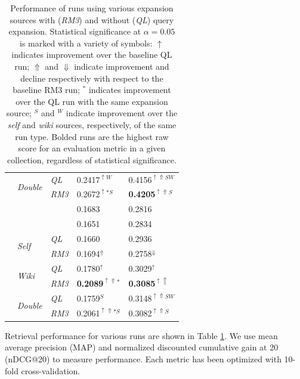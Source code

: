 \documentclass{sig-alternate}
\begin{document}
\begin{table}[htbp]
\begin{tabular}{|c|l|l|l|l|}
\rule{0pt}{2.5ex} & \multirow{2}{*}{\it Double} & {\it QL} & 0.2417$^{\uparrow W}$ & 0.4156$^{\uparrow\Uparrow SW}$ \\ \cline{3-5}
\rule{0pt}{2.5ex} & & {\it RM3} & 0.2672$^{\uparrow *S}$ & \textbf{0.4205}$^{\uparrow\Uparrow S}$ \\ \hline\hline
\rule{0pt}{2.5ex} \multirow{8}{*}{wt10g} & \cellcolor{gray!50} & \cellcolor{gray!50}{\it QL} & \cellcolor{gray!50}0.1683 & \cellcolor{gray!50}0.2816 \\ \cline{3-5}
\rule{0pt}{2.5ex} & \cellcolor{gray!50} \multirow{-2}{*}{\it Baseline} & \cellcolor{gray!50}{\it RM3} & \cellcolor{gray!50}0.1651 & \cellcolor{gray!50}0.2834 \\ \cline{2-5}
\rule{0pt}{2.5ex} & \multirow{2}{*}{\it Self} & {\it QL} & 0.1660 & 0.2936 \\ \cline{3-5}
\rule{0pt}{2.5ex} & & {\it RM3} & 0.1694$^\Uparrow$ & 0.2758$^\Downarrow$ \\ \cline{2-5}
\rule{0pt}{2.5ex} & \multirow{2}{*}{\it Wiki} & {\it QL} & 0.1780$^\uparrow$ & 0.3029$^\uparrow$ \\ \cline{3-5}
\rule{0pt}{2.5ex} & & {\it RM3} & \textbf{0.2089}$^{\uparrow\Uparrow *}$ & \textbf{0.3085}$^{\uparrow\Uparrow}$ \\ \cline{2-5}
\rule{0pt}{2.5ex} & \multirow{2}{*}{\it Double} & {\it QL} & 0.1759$^{S}$ & 0.3148$^{\uparrow\Uparrow SW}$ \\ \cline{3-5}
\rule{0pt}{2.5ex} & & {\it RM3} & 0.2061$^{\uparrow\Uparrow *S}$ & 0.3082$^{\uparrow\Uparrow S}$ \\ \hline
\end{tabular}
\caption{Performance of runs using various expansion sources with (\textit{RM3}) and without (\textit{QL}) query expansion. Statistical significance at $\alpha = 0.05$ is marked with a variety of symbols: $\uparrow$ indicates improvement over the baseline QL run; $\Uparrow$ and $\Downarrow$ indicate improvement and decline respectively with respect to the baseline RM3 run; $^{*}$ indicates improvement over the QL run with the same expansion source; $^{S}$ and $^{W}$ indicate improvement over the \textit{self} and \textit{wiki} sources, respectively, of the same run type. Bolded runs are the highest raw score for an evaluation metric in a given collection, regardless of statistical significance.}
\label{table.performance}
\end{table}

Retrieval performance for various runs are shown in Table \ref{table.performance}. We use mean average precision (MAP) and normalized discounted cumulative gain at 20 (nDCG@20) to measure performance. Each metric has been optimized with 10-fold cross-validation.
\end{document}
